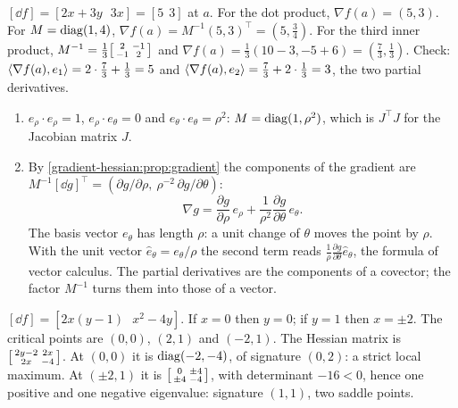 $[\dd f] = [2x + 3y\ \ \ 3x] = [5\ \ 3]$ at $a$. For the dot product,
$\nabla f(a) = (5, 3)$. For $M = \operatorname{diag}(1, 4)$,
$\nabla f(a) = M^{-1}(5, 3)^\top = (5, \frac34)$. For the third inner
product,
$M^{-1} = \frac13\begin{bsmallmatrix}2 & -1\\-1 & 2\end{bsmallmatrix}$ and
$\nabla f(a) = \frac13(10 - 3, -5 + 6) = (\frac73, \frac13)$. Check:
$\left\langle \nabla f(a), e_1 \right\rangle = 2\cdot\frac73 + \frac13 = 5$ and
$\left\langle \nabla f(a), e_2 \right\rangle = \frac73 + 2\cdot\frac13 = 3$, the two
partial derivatives.

\begin{enumerate}[nosep]
  \item $e_\rho\cdot e_\rho = 1$, $e_\rho\cdot e_\theta = 0$ and
        $e_\theta\cdot e_\theta = \rho^2$: $M = \operatorname{diag}(1, \rho^2)$, which
        is $J^\top J$ for the Jacobian matrix $J$.
  \item By \cref{gradient-hessian:prop:gradient} the components of the
        gradient are
        $M^{-1}[\dd g]^\top
        = (\partial g/\partial\rho,\ \rho^{-2}\,\partial g/\partial\theta)$:
        \[
          \nabla g = \frac{\partial g}{\partial\rho}\,e_\rho
          + \frac1{\rho^2}\frac{\partial g}{\partial\theta}\,e_\theta .
        \]
        The basis vector $e_\theta$ has length $\rho$: a unit change of
        $\theta$ moves the point by $\rho$. With the unit vector
        $\hat e_\theta = e_\theta/\rho$ the second term reads
        $\frac1\rho\frac{\partial g}{\partial\theta}\hat e_\theta$, the
        formula of vector calculus. The partial derivatives are the
        components of a covector; the factor $M^{-1}$ turns them into
        those of a vector.
\end{enumerate}

$[\dd f] = [2x(y - 1)\ \ \ x^2 - 4y]$. If $x = 0$ then $y = 0$; if
$y = 1$ then $x = \pm2$. The critical points are $(0, 0)$, $(2, 1)$ and
$(-2, 1)$. The Hessian matrix is
$\begin{bsmallmatrix}2y - 2 & 2x\\2x & -4\end{bsmallmatrix}$. At
$(0, 0)$ it is $\operatorname{diag}(-2, -4)$, of signature $(0, 2)$: a strict local
maximum. At $(\pm2, 1)$ it is
$\begin{bsmallmatrix}0 & \pm4\\\pm4 & -4\end{bsmallmatrix}$, with
determinant $-16 < 0$, hence one positive and one negative eigenvalue:
signature $(1, 1)$, two saddle points.

